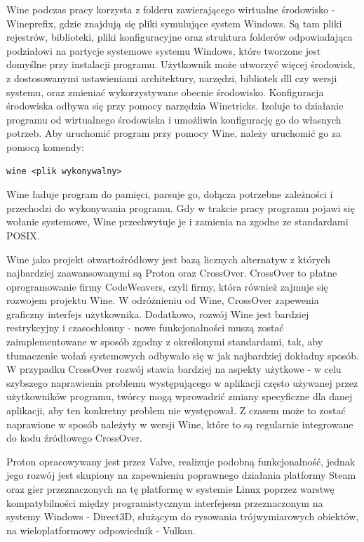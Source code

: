 Wine podczas pracy korzysta z folderu zawierającego wirtualne środowisko - Wineprefix\cite{wineprefix}, gdzie znajdują się pliki symulujące system Windows. Są tam pliki rejestrów, biblioteki, pliki konfiguracyjne oraz struktura folderów odpowiadająca podziałowi na partycje systemowe systemu Windows, które tworzone jest domyślne przy instalacji programu. Użytkownik może utworzyć więcej środowisk, z dostosowanymi ustawieniami architektury, narzędzi, bibliotek dll czy wersji systemu, oraz zmieniać wykorzystywane obecnie środowisko. Konfiguracja środowiska odbywa się przy pomocy narzędzia Winetricks\cite{winetricks}. Izoluje to działanie programu od wirtualnego środowiska i umożliwia konfigurację go do własnych potrzeb. Aby uruchomić program przy pomocy Wine, należy uruchomić go za pomocą komendy:
\begin{verbatim}
wine <plik wykonywalny>
\end{verbatim} Wine ładuje program do pamięci, parsuje go, dołącza potrzebne zależności i przechodzi do wykonywania programu. Gdy w trakcie pracy programu pojawi się wołanie systemowe, Wine przechwytuje je i zamienia na zgodne ze standardami POSIX. 

Wine jako projekt otwartoźródłowy jest bazą licznych alternatyw\cite{wineBasedProjects} z których najbardziej zaawansowanymi są Proton\cite{proton} oraz CrossOver\cite{crossover}. CrossOver to płatne oprogramowanie firmy CodeWeavers, czyli firmy, która również zajmuje się rozwojem projektu Wine. W odróżnieniu od Wine, CrossOver zapewenia graficzny interfejs użytkownika. Dodatkowo, rozwój Wine jest bardziej restrykcyjny i czasochłonny - nowe funkcjonalności muszą zostać zaimplementowane w sposób zgodny z określonymi standardami, tak, aby tłumaczenie wołań systemowych odbywało się w jak najbardziej dokładny sposób. W przypadku CrossOver rozwój stawia bardziej na aspekty użytkowe - w celu szybszego naprawienia problemu występującego w aplikacji często używanej przez użytkowników programu, twórcy mogą wprowadzić zmiany specyficzne dla danej aplikacji, aby ten konkretny problem nie występował. Z czasem może to zostać naprawione w sposób należyty w wersji Wine, które to są regularnie integrowane do kodu źródłowego CrossOver.

Proton opracowywany jest przez Valve, realizuje podobną funkcjonalność, jednak jego rozwój jest skupiony na zapewnieniu poprawnego działania platformy Steam oraz gier przeznaczonych na tę platformę w systemie Linux poprzez warstwę kompatybilności między programistycznym interfejsem przeznaczonym na systemy Windows - Direct3D, służącym do rysowania trójwymiarowych obiektów, na wieloplatformowy odpowiednik - Vulkan.

